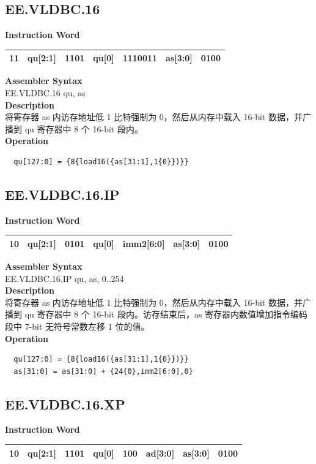 \clearpage
\subsection{EE.VLDBC.16}\label{instruction:EEVLDBC16}
\setlength\tabcolsep{6pt}
\textbf{Instruction Word} \\
\begin{tabular}{|c|c|c|c|c|c|c|}
	\hline
	11 & qu[2:1] & 1101 & qu[0] & 1110011 & as[3:0] & 0100 \\
	\hline
\end{tabular}

\textbf{Assembler Syntax} \\
EE.VLDBC.16 qu, as \\
\textbf{Description} \\
将寄存器 as 内访存地址低 1 比特强制为 0，然后从内存中载入 16-bit 数据，并广播到 qu 寄存器中 8 个 16-bit 段内。\\
\textbf{Operation}
\begin{lstlisting}
  qu[127:0] = {8{load16({as[31:1],1{0}})}}
\end{lstlisting}

\clearpage
\subsection{EE.VLDBC.16.IP}\label{instruction:EEVLDBC16IP}
\setlength\tabcolsep{6pt}
\textbf{Instruction Word} \\
\begin{tabular}{|c|c|c|c|c|c|c|}
	\hline
	10 & qu[2:1] & 0101 & qu[0] & imm2[6:0] & as[3:0] & 0100 \\
	\hline
\end{tabular}

\textbf{Assembler Syntax} \\
EE.VLDBC.16.IP qu, as, 0..254 \\
\textbf{Description} \\
将寄存器 as 内访存地址低 1 比特强制为 0，然后从内存中载入 16-bit 数据，并广播到 qu 寄存器中 8 个 16-bit 段内。访存结束后，as 寄存器内数值增加指令编码段中 7-bit 无符号常数左移 1 位的值。\\
\textbf{Operation}
\begin{lstlisting}
  qu[127:0] = {8{load16({as[31:1],1{0}})}}
  as[31:0] = as[31:0] + {24{0},imm2[6:0],0}
\end{lstlisting}

\clearpage
\subsection{EE.VLDBC.16.XP}\label{instruction:EEVLDBC16XP}
\setlength\tabcolsep{6pt}
\textbf{Instruction Word} \\
\begin{tabular}{|c|c|c|c|c|c|c|c|}
	\hline
	10 & qu[2:1] & 1101 & qu[0] & 100 & ad[3:0] & as[3:0] & 0100 \\
	\hline
\end{tabular}

